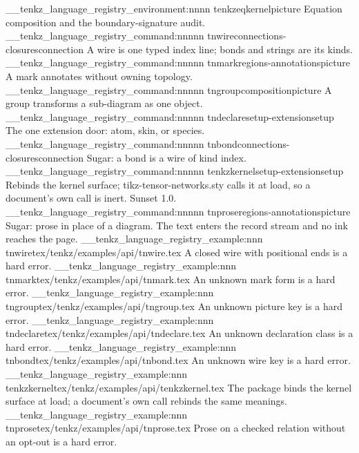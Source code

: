 %
\__tenkz_language_registry_environment:nnnn {tenkzeq}{kernel}{picture}
  {Equation composition and the boundary-signature audit.}
\__tenkz_language_registry_command:nnnnn {tnwire}{connections-closures}{connection}
  {}{A wire is one typed index line; bonds and strings are its kinds.}
\__tenkz_language_registry_command:nnnnn {tnmark}{regions-annotations}{picture}
  {}{A mark annotates without owning topology.}
\__tenkz_language_registry_command:nnnnn {tngroup}{composition}{picture}
  {}{A group transforms a sub-diagram as one object.}
\__tenkz_language_registry_command:nnnnn {tndeclare}{setup-extension}{setup}
  {}{The one extension door: atom, skin, or species.}
\__tenkz_language_registry_command:nnnnn {tnbond}{connections-closures}{connection}
  {}{Sugar: a bond is a wire of kind index.}
\__tenkz_language_registry_command:nnnnn {tenkzkernel}{setup-extension}{setup}
  {\tenkzkernel}{Rebinds the kernel surface; tikz-tensor-networks.sty calls it at load, so a document's own call is inert. Sunset 1.0.}
\__tenkz_language_registry_command:nnnnn {tnprose}{regions-annotations}{picture}
  {}{Sugar: prose in place of a diagram. The text enters the record stream and no ink reaches the page.}
\__tenkz_language_registry_example:nnn {tnwire}{tex/tenkz/examples/api/tnwire.tex}
  {A closed wire with positional ends is a hard error.}
\__tenkz_language_registry_example:nnn {tnmark}{tex/tenkz/examples/api/tnmark.tex}
  {An unknown mark form is a hard error.}
\__tenkz_language_registry_example:nnn {tngroup}{tex/tenkz/examples/api/tngroup.tex}
  {An unknown picture key is a hard error.}
\__tenkz_language_registry_example:nnn {tndeclare}{tex/tenkz/examples/api/tndeclare.tex}
  {An unknown declaration class is a hard error.}
\__tenkz_language_registry_example:nnn {tnbond}{tex/tenkz/examples/api/tnbond.tex}
  {An unknown wire key is a hard error.}
\__tenkz_language_registry_example:nnn {tenkzkernel}{tex/tenkz/examples/api/tenkzkernel.tex}
  {The package binds the kernel surface at load; a document's own call rebinds the same meanings.}
\__tenkz_language_registry_example:nnn {tnprose}{tex/tenkz/examples/api/tnprose.tex}
  {Prose on a checked relation without an opt-out is a hard error.}

